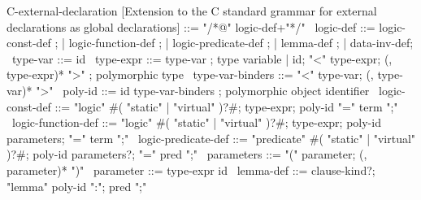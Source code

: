 \begin{syntax}
  C-external-declaration [Extension to the C  standard grammar for external declarations as global  declarations] ::= "/*@" logic-def+"*/"
  \
  logic-def ::= logic-const-def ;
          | logic-function-def ;
          | logic-predicate-def ;
          | lemma-def ;
          | data-inv-def;
  \
  type-var ::= id
  \
  type-expr ::= type-var ; type variable
  | id;
    "<" type-expr;
    (, type-expr)* ">" ; polymorphic type
  \
  type-var-binders ::= "<" type-var;
                       (, type-var)* ">"
  \
  poly-id ::= id type-var-binders ; polymorphic object identifier
  \
  logic-const-def ::= "logic" \ifCPPnc#( "static" | "virtual" )?#;
  type-expr;
  poly-id "=" term ";"
  \
  logic-function-def ::= "logic" \ifCPPnc#( "static" | "virtual" )?#;
  type-expr;
  poly-id parameters;
  "=" term ";"
  \
  logic-predicate-def ::=
  "predicate" \ifCPPnc#( "static" | "virtual" )?#;
  poly-id parameters?;
  "=" pred ";"
  \
  parameters ::= "(" parameter;
                 (, parameter)* ")"
  \
  parameter ::= type-expr id
  \
  lemma-def ::= clause-kind?;
                "lemma" poly-id ":";
                   pred ";"
\end{syntax}
